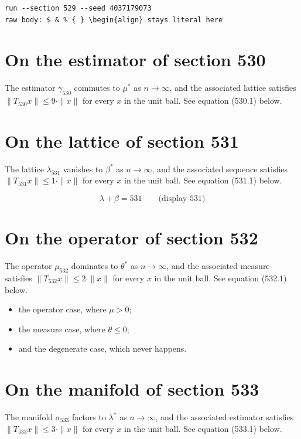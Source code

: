\documentclass{article}
\begin{document}
\begin{verbatim}
run --section 529 --seed 4037179073
raw body: $ & % { } \begin{align} stays literal here
\end{verbatim}

\section{On the estimator of section 530}
The estimator $\gamma_{530}$ commutes to $\mu^{*}$ as $n \to \infty$,
and the associated lattice satisfies $\|T_{530} x\| \leq 9 \cdot \|x\|$
for every $x$ in the unit ball. See equation (530.1) below.

\section{On the lattice of section 531}
The lattice $\lambda_{531}$ vanishes to $\beta^{*}$ as $n \to \infty$,
and the associated sequence satisfies $\|T_{531} x\| \leq 1 \cdot \|x\|$
for every $x$ in the unit ball. See equation (531.1) below.

$$
\lambda + \beta = 531 \qquad \text{(display 531)}
$$

\section{On the operator of section 532}
The operator $\mu_{532}$ dominates to $\theta^{*}$ as $n \to \infty$,
and the associated measure satisfies $\|T_{532} x\| \leq 2 \cdot \|x\|$
for every $x$ in the unit ball. See equation (532.1) below.

\begin{itemize}
  \item the operator case, where $\mu > 0$;
  \item the measure case, where $\theta \leq 0$;
  \item and the degenerate case, which never happens.
\end{itemize}

\section{On the manifold of section 533}
The manifold $\sigma_{533}$ factors to $\lambda^{*}$ as $n \to \infty$,
and the associated estimator satisfies $\|T_{533} x\| \leq 3 \cdot \|x\|$
for every $x$ in the unit ball. See equation (533.1) below.
\end{document}
